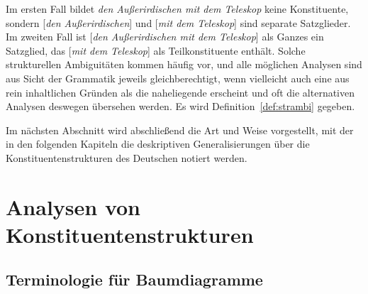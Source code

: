 \begin{exe}
  \ex\label{ex:strukturelleambiguitaet061}
  \begin{xlist}
  \end{xlist}
\end{exe}

Im ersten Fall bildet \textit{den Außerirdischen mit dem Teleskop} keine Konstituente, sondern [\textit{den Außerirdischen}] und [\textit{mit dem Teleskop}] sind separate Satzglieder.
Im zweiten Fall ist [\textit{den Außerirdischen mit dem Teleskop}] als Ganzes ein Satzglied, das [\textit{mit dem Teleskop}] als Teilkonstituente enthält.
Solche strukturellen Ambiguitäten kommen häufig vor, und alle möglichen Analysen sind aus Sicht der Grammatik jeweils gleichberechtigt, wenn vielleicht auch eine aus rein inhaltlichen Gründen als die naheliegende erscheint und oft die alternativen Analysen deswegen übersehen werden.
Es wird Definition~\ref{def:strambi} gegeben.


Im nächsten Abschnitt wird abschließend die Art und Weise vorgestellt, mit der in den folgenden Kapiteln die deskriptiven Generalisierungen über die Konstituentenstrukturen des Deutschen notiert werden.


\section{Analysen von Konstituentenstrukturen}
\label{sec:analysenvonkonstituentenstrukturen}

\subsection{Terminologie für Baumdiagramme}
\label{sec:terminologiefuerbaumdiagramme}

